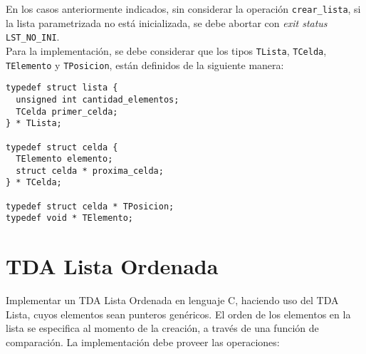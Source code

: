 \documentclass[12pt,a4paper]{article}
\begin{document}
En los casos anteriormente indicados, sin considerar la operación \texttt{crear\_lista}, si la lista parametrizada no está inicializada, se debe abortar con \emph{exit status} \texttt{LST\_NO\_INI}. \\

Para la implementación, se debe considerar que los tipos \texttt{TLista}, \texttt{TCelda},  \texttt{TElemento} y \texttt{TPosicion}, están definidos de la siguiente manera:

\begin{verbatim}
typedef struct lista {
  unsigned int cantidad_elementos;
  TCelda primer_celda;
} * TLista;

typedef struct celda {
  TElemento elemento;
  struct celda * proxima_celda;
} * TCelda;

typedef struct celda * TPosicion;
typedef void * TElemento;

\end{verbatim}

\section{TDA Lista Ordenada}
Implementar un TDA Lista Ordenada en lenguaje C, haciendo uso del TDA Lista, cuyos elementos sean punteros genéricos. El orden de los elementos en la lista se especifica al momento de la creación, a través de una función de comparación. La implementación debe proveer las operaciones:
\end{document}
